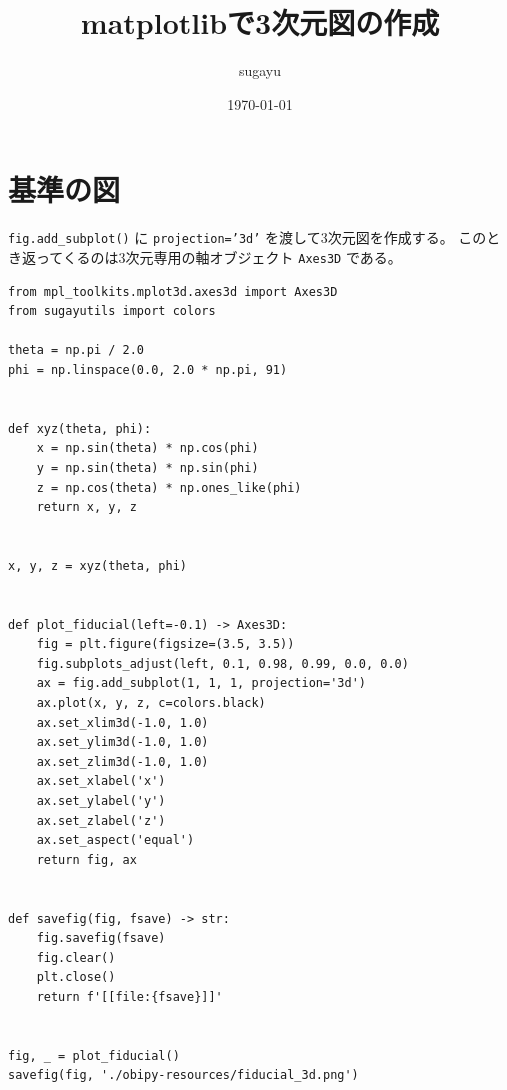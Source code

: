 \documentclass[a4paper, 10pt, notitlepage, twocolumn, uplatex, oneside, dvipdfmx]{jsarticle}
\author{sugayu}
\date{\today}
\title{\textbf{matplotlibで3次元図の作成}}
\begin{document}
\maketitle
\tableofcontents

\section{基準の図}
\label{sec:orgfa59f90}
\texttt{fig.add\_subplot()} に \texttt{projection='3d'} を渡して3次元図を作成する。
このとき返ってくるのは3次元専用の軸オブジェクト \texttt{Axes3D} である。

\begin{verbatim}
from mpl_toolkits.mplot3d.axes3d import Axes3D
from sugayutils import colors

theta = np.pi / 2.0
phi = np.linspace(0.0, 2.0 * np.pi, 91)


def xyz(theta, phi):
    x = np.sin(theta) * np.cos(phi)
    y = np.sin(theta) * np.sin(phi)
    z = np.cos(theta) * np.ones_like(phi)
    return x, y, z


x, y, z = xyz(theta, phi)


def plot_fiducial(left=-0.1) -> Axes3D:
    fig = plt.figure(figsize=(3.5, 3.5))
    fig.subplots_adjust(left, 0.1, 0.98, 0.99, 0.0, 0.0)
    ax = fig.add_subplot(1, 1, 1, projection='3d')
    ax.plot(x, y, z, c=colors.black)
    ax.set_xlim3d(-1.0, 1.0)
    ax.set_ylim3d(-1.0, 1.0)
    ax.set_zlim3d(-1.0, 1.0)
    ax.set_xlabel('x')
    ax.set_ylabel('y')
    ax.set_zlabel('z')
    ax.set_aspect('equal')
    return fig, ax


def savefig(fig, fsave) -> str:
    fig.savefig(fsave)
    fig.clear()
    plt.close()
    return f'[[file:{fsave}]]'


fig, _ = plot_fiducial()
savefig(fig, './obipy-resources/fiducial_3d.png')
\end{verbatim}
\end{document}

